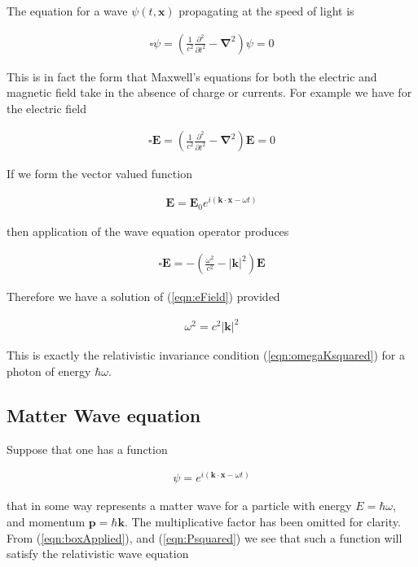 \documentclass[]{eliblog}
\newcommand{\Abs}[1]{{\left\lvert{#1}\right\rvert}}
\newcommand{\BE}[0]{\mathbf{E}}
\newcommand{\Bk}[0]{\mathbf{k}}
\newcommand{\Bp}[0]{\mathbf{p}}
\newcommand{\Bx}[0]{\mathbf{x}}
\newcommand{\spacegrad}[0]{\boldsymbol{\nabla}}
\newcommand{\delambertian}[0]{\square}
\begin{document}
The equation for a wave $\psi(t,\Bx)$ propagating at the speed of light is

\begin{align}
\delambertian \psi = \left( \frac{1}{c^2}\frac{\partial^2}{{\partial t}^2} - \spacegrad^2 \right) \psi = 0
\end{align}

This is in fact the form that Maxwell's equations for both the electric and magnetic field take in the absence of charge or currents.
For example we have for the electric field

\begin{align}\label{eqn:eField}
\delambertian \BE = \left( \frac{1}{c^2}\frac{\partial^2}{{\partial t}^2} - \spacegrad^2 \right) \BE = 0
\end{align}

If we form the vector valued function

\begin{align}\label{eqn:testSolutionE}
\BE = \BE_0 e^{ i( \Bk \cdot \Bx - \omega t ) }
\end{align}

then application of the wave equation operator produces

\begin{align}\label{eqn:boxApplied}
\delambertian \BE = -\left( \frac{\omega^2}{c^2} - \Abs{\Bk}^2 \right) \BE
\end{align}

Therefore we have a solution of (\ref{eqn:eField}) provided

\begin{align}
\omega^2 = c^2 \Abs{\Bk}^2
\end{align}

This is exactly the relativistic invariance condition (\ref{eqn:omegaKsquared}) for a photon of energy $\hbar \omega$.

\subsection{Matter Wave equation}

Suppose that one has a function

\begin{align}\label{eqn:waveFunction}
\psi = e^{ i( \Bk \cdot \Bx - \omega t) }
\end{align}

that in some way represents a matter wave for a particle with energy $E = \hbar \omega$, and momentum
 $\Bp = \hbar \Bk$.  The multiplicative factor has been omitted for clarity.
From (\ref{eqn:boxApplied}), and
(\ref{eqn:Psquared})
we see that such a function will satisfy the relativistic wave equation
\end{document}
